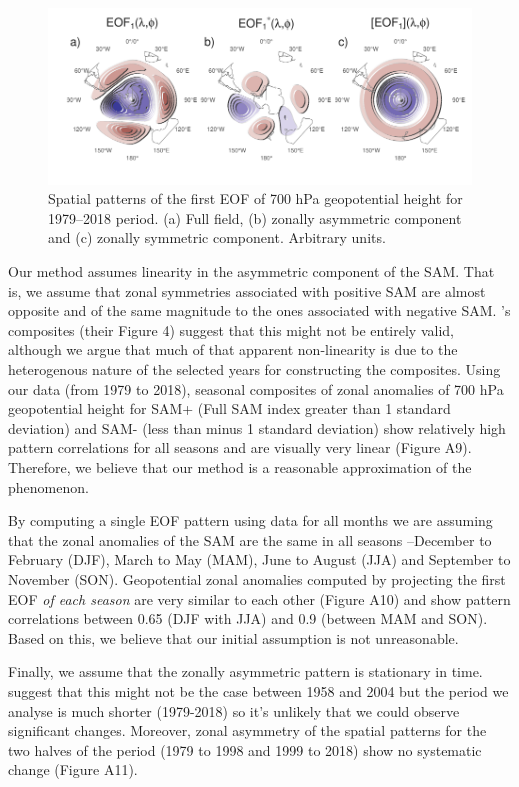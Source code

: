 \documentclass[]{ametsocV5}
\begin{document}
\begin{figure}
\includegraphics{method-1} \caption[Spatial patterns of the first EOF of 700 hPa geopotential height for 1979–2018 period]{Spatial patterns of the first EOF of 700 hPa geopotential height for 1979–2018 period. (a) Full field, (b) zonally asymmetric component and (c) zonally symmetric component. Arbitrary units.}\label{fig:method}
\end{figure}

Our method assumes linearity in the asymmetric component of the SAM.
That is, we assume that zonal symmetries associated with positive SAM
are almost opposite and of the same magnitude to the ones associated
with negative SAM. \citet{fogt2012}'s composites (their Figure 4)
suggest that this might not be entirely valid, although we argue that
much of that apparent non-linearity is due to the heterogenous nature of
the selected years for constructing the composites. Using our data (from
1979 to 2018), seasonal composites of zonal anomalies of 700 hPa
geopotential height for SAM+ (Full SAM index greater than 1 standard
deviation) and SAM- (less than minus 1 standard deviation) show
relatively high pattern correlations for all seasons and are visually
very linear (Figure A9). Therefore, we believe that our method is a
reasonable approximation of the phenomenon.

By computing a single EOF pattern using data for all months we are
assuming that the zonal anomalies of the SAM are the same in all seasons
--December to February (DJF), March to May (MAM), June to August (JJA)
and September to November (SON). Geopotential zonal anomalies computed
by projecting the first EOF \emph{of each season} are very similar to
each other (Figure A10) and show pattern correlations between 0.65 (DJF
with JJA) and 0.9 (between MAM and SON). Based on this, we believe that
our initial assumption is not unreasonable.

Finally, we assume that the zonally asymmetric pattern is stationary in
time. \citet{silvestri2009} suggest that this might not be the case
between 1958 and 2004 but the period we analyse is much shorter
(1979-2018) so it's unlikely that we could observe significant changes.
Moreover, zonal asymmetry of the spatial patterns for the two halves of
the period (1979 to 1998 and 1999 to 2018) show no systematic change
(Figure A11).
\end{document}
